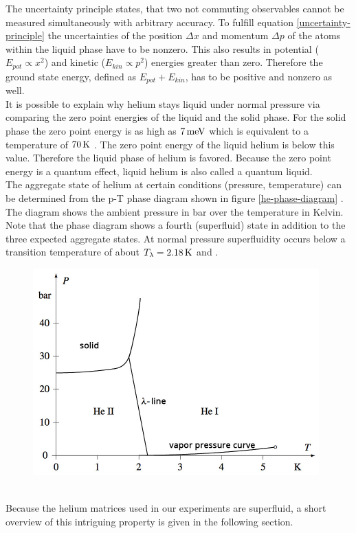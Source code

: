 \documentclass[parskip,12pt,headsepline,a4paper] {scrbook}
\begin{document}
The uncertainty principle states, that two not commuting observables cannot be measured simultaneously with arbitrary accuracy. To fulfill equation \ref{uncertainty-principle} the uncertainties of the position $\Delta x$ and momentum $\Delta p$ of the atoms within the liquid phase have to be nonzero. This also results in potential ($E_{pot} \propto x^2$) and kinetic ($E_{kin} \propto p^2$) energies greater than zero. Therefore the ground state energy, defined as $E_{pot} + E_{kin}$, has to be positive and nonzero as well. \\
It is possible to explain why helium stays liquid under normal pressure via comparing the zero point energies of the liquid and the solid phase. For the solid phase the zero point energy is as high as $\unit[7]{meV}$ which is equivalent to a temperature of $\unit[70]{K}$ \cite{lackner}. The zero point energy of the liquid helium is below this value. Therefore the liquid phase of helium is favored. Because the zero point energy is a quantum effect, liquid helium is also called a quantum liquid. \\
The aggregate state of helium at certain conditions (pressure, temperature) can be determined from the p-T phase diagram shown in figure \ref{he-phase-diagram} \cite{fliessbach}. The diagram shows the ambient pressure in bar over the temperature in Kelvin. Note that the phase diagram shows a fourth (superfluid) state in addition to the three expected aggregate states. At normal pressure superfluidity occurs below a transition temperature of about $T_\lambda = \unit[2.18]{K}$ \cite{toennis} and \cite{ernst2011}.
\begin{figure}[ht]
\centerline{
\includegraphics[width=11cm]{./helium/phasediagram.jpg}}
\end{figure} \\
Because the helium matrices used in our experiments are superfluid, a short overview of this intriguing property is given in the following section.
\end{document}
